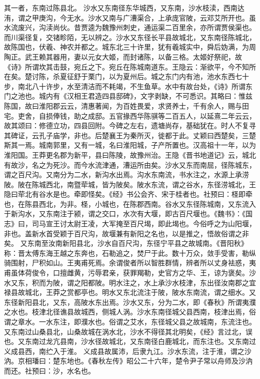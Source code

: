 \documentclass[12pt,UTF8]{ctexbook}
\begin{document}
其一者，东南过陈县北。
沙水又东南径东华城西，又东南，沙水枝渎，西南达洧，谓之甲庚沟，今无水。沙水又南与广漕渠合，上承庞官陂，云邓艾所开也。虽水流废兴，沟渎尚伙。昔贾逵为魏豫州刺史，通运渠二百里余，亦所谓贾侯渠也。而川渠径复，交锗畛陌，无以辨之。沙水又东径长平县故城北，又东南径陈城北，故陈国也，伏羲、神农并都之。城东北三十许里，犹有羲城实中，舜后妫满，为周陶正。武王赖其器用，妻以元女大姬，而封诸陈，以备三格。太姬好祭祀，故《诗》所谓坎其击鼓，宛丘之下。宛丘在陈城南道东。王隐云：渐欲平，今不知所在矣。楚讨陈，杀夏征舒于栗门，以为夏州后。城之东门内有池，池水东西七十步，南北八十许步，水至清洁而不耗竭，不生鱼草。水中有故台处，《诗》所谓东门之池也。城内有《汉相王君造四县邸碑》，文字剥缺，不可悉识。其略曰：惟兹陈国，故曰淮阳郡云云，清惠著闻，为百姓畏爱，求贤养士，千有余人，赐与田宅。吏舍，自损俸钱，助之成邸。五官掾西华陈骐等二百五人，以延熹二年云云，故其颂曰：修德立功，四县回附。今碑之左右，遗塘尚存，基础犹在。时人不复寻其碑证，云孔子庙学，非也。后楚襄王为秦所灭，徙都于此。丈颖曰西楚矣，三楚斯其一焉。城南郭里，又有一城，名曰淮阳城，子产所置也。汉高祖十一年，以为淮阳国。王莽更名郡为新平，县曰陈陵，故豫州治。王隐《晋书地道记》云，城北有故沙，名之为死沙。而今水流津通，漕运所由矣。沙水又东而南屈，径陈城东，谓之百尺沟。又南分为二水，新沟水出焉。沟水东南流，书水注之，水源上承涝陂。陂在陈城西北，南暨荦城，皆为陂矣。陂水东流，谓之谷水，东径涝城北，王隐曰荦北有谷水是也。牵即怪矣。《经》书公会齐、宋于桂者也。社预曰：柽即牵也，在陈县西北，为非。柽，小城也，在陈郡西南。谷水又东径陈城南，又东流入于新沟水，又东南注于颍，谓之交口，水次有大堰，即古百尺堰也。《魏书》：《国志》曰，司马宣王讨太尉王凌，大军掩至百尺堨，即此堨也。今俗呼之为山阳堰，非也。盖新水首受颖于百尺沟，故堰兼有新阳之名也，以是推之，悟故俗谓之非矣。
又东南至汝南新阳县北，沙水自百尺沟，东径宁平县之故城南。《晋阳秋》称：晋太傅东海王越之东奔也，石勒追之，焚尸于此。数十万众，敛手受害，勒纵骑围射，尸积如山。王夷甫死焉。余谓俊者所以智胜群情，辨者所以丈身袪惑，夷甫虽体荷俊令，口擅雌黄，污辱君亲，获罪羯勒，史官方之华、王，谅为褒矣。沙水又东，积而为陂，谓之阳都陂。明水注之，水上承沙水枝津，东出径汝南郡之宜禄县故城北，王莽之赏都亭也。明水又东北流注于陂，陂水东南流，谓之细水。又东径新阳县北，又东，高陂水东出焉。沙水又东，分为二水，即《春秋》所谓夷濮之水也。枝津北径谯县故城西，侧城人涡。沙水东南径城父县西南，枝津出焉，俗谓之章水。一水东注，即濮水也。俗谓之艾水，东径城父县之故城南，东流注也。
又东南过山桑县北，山桑故城在涡水北，沙水不得径其北明矣，《经》言过北，误也。又东南过龙亢县南，沙水径故城北，又东南径白鹿城北，而东注也。又东南过义成县西，南纻入于淮。
义成县故属沛，后隶九江。沙水东流，注于淮，谓之沙汭。京相璠曰：楚东地也。《春秋左传》昭公二十六年，楚令尹子常以舟师及沙汭而还。社预曰：沙，水名也。
\end{document}
